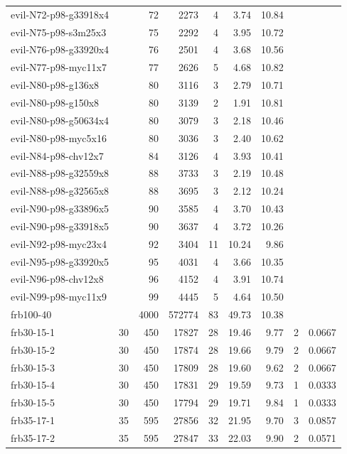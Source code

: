 \begin{longtable}{llrrrrrll}
evil-N72-p98-g33918x4 &  & 72 & 2273 & 4 & 3.74 & 10.84 &  &  \\
evil-N75-p98-s3m25x3 &  & 75 & 2292 & 4 & 3.95 & 10.72 &  &  \\
evil-N76-p98-g33920x4 &  & 76 & 2501 & 4 & 3.68 & 10.56 &  &  \\
evil-N77-p98-myc11x7 &  & 77 & 2626 & 5 & 4.68 & 10.82 &  &  \\
evil-N80-p98-g136x8 &  & 80 & 3116 & 3 & 2.79 & 10.71 &  &  \\
evil-N80-p98-g150x8 &  & 80 & 3139 & 2 & 1.91 & 10.81 &  &  \\
evil-N80-p98-g50634x4 &  & 80 & 3079 & 3 & 2.18 & 10.46 &  &  \\
evil-N80-p98-myc5x16 &  & 80 & 3036 & 3 & 2.40 & 10.62 &  &  \\
evil-N84-p98-chv12x7 &  & 84 & 3126 & 4 & 3.93 & 10.41 &  &  \\
evil-N88-p98-g32559x8 &  & 88 & 3733 & 3 & 2.19 & 10.48 &  &  \\
evil-N88-p98-g32565x8 &  & 88 & 3695 & 3 & 2.12 & 10.24 &  &  \\
evil-N90-p98-g33896x5 &  & 90 & 3585 & 4 & 3.70 & 10.43 &  &  \\
evil-N90-p98-g33918x5 &  & 90 & 3637 & 4 & 3.72 & 10.26 &  &  \\
evil-N92-p98-myc23x4 &  & 92 & 3404 & 11 & 10.24 & 9.86 &  &  \\
evil-N95-p98-g33920x5 &  & 95 & 4031 & 4 & 3.66 & 10.35 &  &  \\
evil-N96-p98-chv12x8 &  & 96 & 4152 & 4 & 3.91 & 10.74 &  &  \\
evil-N99-p98-myc11x9 &  & 99 & 4445 & 5 & 4.64 & 10.50 &  &  \\
frb100-40 &  & 4000 & 572774 & 83 & 49.73 & 10.38 &  &  \\
frb30-15-1 & 30 & 450 & 17827 & 28 & 19.46 & 9.77 & 2 & 0.0667 \\
frb30-15-2 & 30 & 450 & 17874 & 28 & 19.66 & 9.79 & 2 & 0.0667 \\
frb30-15-3 & 30 & 450 & 17809 & 28 & 19.60 & 9.62 & 2 & 0.0667 \\
frb30-15-4 & 30 & 450 & 17831 & 29 & 19.59 & 9.73 & 1 & 0.0333 \\
frb30-15-5 & 30 & 450 & 17794 & 29 & 19.71 & 9.84 & 1 & 0.0333 \\
frb35-17-1 & 35 & 595 & 27856 & 32 & 21.95 & 9.70 & 3 & 0.0857 \\
frb35-17-2 & 35 & 595 & 27847 & 33 & 22.03 & 9.90 & 2 & 0.0571 \\

\end{longtable}
